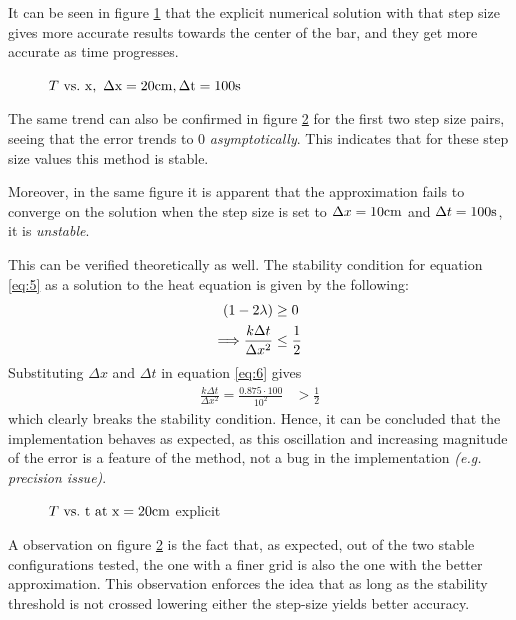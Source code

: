 \documentclass[a4paper]{article} %
\begin{document}
\begin{multicols}{2}
It can be seen in figure \ref{fig:p1_1} that the explicit numerical solution with that step size gives more accurate results towards the center of the bar, and they get more accurate as time progresses.

\begin{figure}[H]
    
    \caption{$T\ \rm{vs.}\ x,\ \Delta x = 20\rm{cm}, \Delta t = 100\rm{s} $}
    \label{fig:p1_1}
\end{figure}

The same trend can also be confirmed in figure \ref{fig:p1_2} for the first two step size pairs, seeing that the error trends to 0 \textit{asymptotically}. This indicates that for these step size values this method is stable.

Moreover, in the same figure it is apparent that the approximation fails to converge on the solution when the step size is set to $\Delta x = 10\rm{cm}$ and $\Delta t = 100\rm{s}$, it is \textit{unstable}. 

This can be verified theoretically as well. The stability condition for equation \eqref{eq:5} as a solution to the heat equation is given by the following:
\begin{align}
    (1-2\lambda) &\ge 0 \notag \\
    \Longrightarrow \frac{k\Delta t}{\Delta x^2} &\le \frac{1}{2} \label{eq:6}
\end{align}
Substituting $\Delta x$ and $\Delta t$ in equation \eqref{eq:6} gives
\begin{align}
\frac{k\Delta t}{\Delta x^2} = \frac{0.875 \cdot 100}{10^2} &> \frac{1}{2}
\end{align}
which clearly breaks the stability condition. Hence, it can be concluded that the implementation behaves as expected, as this oscillation and increasing magnitude of the error is a feature of the method, not a bug in the implementation \textit{(e.g. precision issue)}. 

\vspace{-3mm} 
\begin{figure}[H]
    
        \caption{$T\ \rm{vs.}\ t \text{ at } x = 20\rm{cm}$ explicit}
    \label{fig:p1_2}
\end{figure}

A observation on figure \ref{fig:p1_2} is the fact that, as expected, out of the two stable configurations tested, the one with a finer grid is also the one with the better approximation. This observation enforces the idea that as long as the stability threshold is not crossed lowering either the step-size yields better accuracy.   


\end{multicols}
\end{document}
